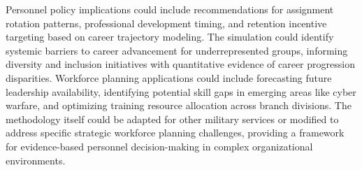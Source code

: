 \documentclass[main.tex]{subfiles}
\begin{document}
Personnel policy implications could include recommendations for assignment rotation patterns, professional development timing, and retention incentive targeting based on career trajectory modeling. The simulation could identify systemic barriers to career advancement for underrepresented groups, informing diversity and inclusion initiatives with quantitative evidence of career progression disparities. Workforce planning applications could include forecasting future leadership availability, identifying potential skill gaps in emerging areas like cyber warfare, and optimizing training resource allocation across branch divisions. The methodology itself could be adapted for other military services or modified to address specific strategic workforce planning challenges, providing a framework for evidence-based personnel decision-making in complex organizational environments.
\end{document}
